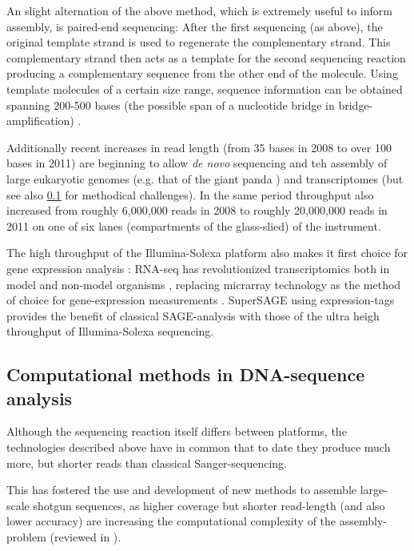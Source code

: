 An slight alternation of the above method, which is extremely useful
to inform assembly, is paired-end sequencing: After the first
sequencing (as above), the original template strand is used to
regenerate the complementary strand. This complementary strand then
acts as a template for the second sequencing reaction producing a
complementary sequence from the other end of the molecule. Using
template molecules of a certain size range, sequence information can
be obtained spanning 200-500 bases (the possible span of a nucleotide
bridge in bridge-amplification) \cite{pmid18987734}.

Additionally recent increases in read length (from 35 bases in 2008 to
over 100 bases in 2011) are beginning to allow \textit{de novo}
sequencing and teh assembly of large eukaryotic genomes (e.g. that of
the giant panda \cite{pmid20010809}) and transcriptomes
\cite{pmid21679424} (but see also \ref{sec:comp-meth-dna} for
methodical challenges). In the same period throughput also increased
from roughly 6,000,000 reads in 2008 to roughly 20,000,000 reads in
2011 on one of six lanes (compartments of the glass-slied) of the
instrument.

The high throughput of the Illumina-Solexa platform also makes it
first choice for gene expression analysis \cite{pmid21627854}: RNA-seq
has revolutionized transcriptomics both in model and non-model
organisms \cite{pmid19015660}, replacing micrarray technology as the
method of choice for gene-expression measurements \cite{pmid18927111}.
SuperSAGE \cite{pmid20967605} using expression-tags provides the
benefit of classical SAGE-analysis \cite{pmid7570003} with those of
the ultra heigh throughput of Illumina-Solexa sequencing.

\subsection{Computational methods in DNA-sequence analysis}
\label{sec:comp-meth-dna}

Although the sequencing reaction itself differs between platforms, the
technologies described above have in common that to date they produce
much more, but shorter reads than classical Sanger-sequencing.

This has fostered the use and development of new methods to assemble
large-scale shotgun sequences, as higher coverage but shorter
read-length (and also lower accuracy) are increasing the computational
complexity of the assembly-problem (reviewed in \cite{pmid20211242}).

